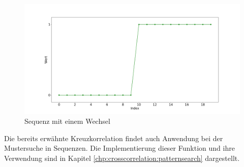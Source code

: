 \begin{figure}[H]
	\centering
	\includegraphics[scale=0.32]{images/sequences/change}
	\caption{Sequenz mit einem Wechsel}
	\label{fig:classification-sequences-change}
\end{figure}

Die bereits erwähnte Kreuzkorrelation findet auch Anwendung bei der Mustersuche in Sequenzen. Die Implementierung dieser Funktion und ihre Verwendung sind in Kapitel \ref{chp:crosscorrelation:patternsearch} dargestellt.